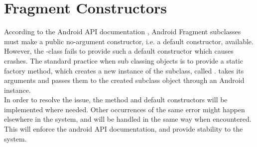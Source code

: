 
\section{Fragment Constructors}
\label{sec:fragment_constructors}

According to the Android API documentation \parencite{android_dev_fragment}, Android Fragment subclasses must make a public no-argument constructor, i.e. a default constructor, available. However, the \giraf-class  fails to provide such a default constructor which causes crashes. The standard practice when sub classing  objects is to provide a static factory method, which creates a new instance of the  subclass, called .  takes its arguments and passes them to the created  subclass object through an Android  instance. \\

In order to resolve the issue, the  method and default constructors will be implemented where needed. Other occurrences of the same error might happen elsewhere in the system, and will be handled in the same way when encountered. This will enforce the android API documentation, and provide stability to the system. 